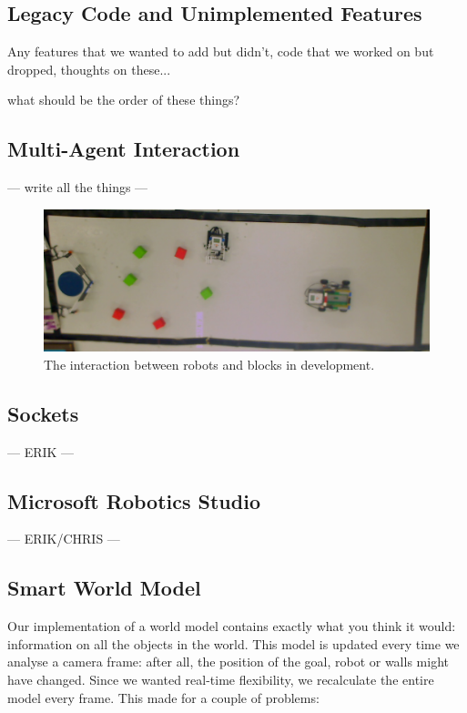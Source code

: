 \documentclass[10pt, abstracton]{scrartcl}
\begin{document}
\begin{appendices}

\section{Legacy Code and Unimplemented Features}
Any features that we wanted to add but didn't, code that we worked on but dropped, thoughts on these...

what should be the order of these things?

\subsection{Multi-Agent Interaction}
\label{sec:multiagent}
---
write all the things
---

\begin{figure}
	\centering
	\includegraphics[width=\columnwidth]{pictures/photo3development.png}
	\caption{\small The interaction between robots and blocks in development.}
	\label{fig:photo4development}
\end{figure}

\subsection{Sockets}
---
ERIK
---

\subsection{Microsoft Robotics Studio}
---
ERIK/CHRIS
---

\subsection{Smart World Model}
Our implementation of a world model contains exactly what you think it would: information on all the objects in the world. This model is updated every time we analyse a camera frame: after all, the position of the goal, robot or walls might have changed. Since we wanted real-time flexibility, we recalculate the entire model every frame. This made for a couple of problems:


\end{appendices}
\end{document}
